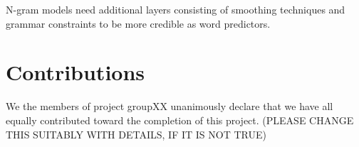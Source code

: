 \documentclass[a4paper,12pt]{article}
\begin{document}
N-gram models need additional layers consisting of smoothing techniques and grammar constraints to be more credible as  word predictors.


\section{Contributions}
\label{sec:contributions}
We the members of project groupXX unanimously declare that 
we have all equally contributed toward the completion of this
project. (PLEASE CHANGE THIS SUITABLY WITH DETAILS, IF IT IS NOT TRUE)






\end{document}
